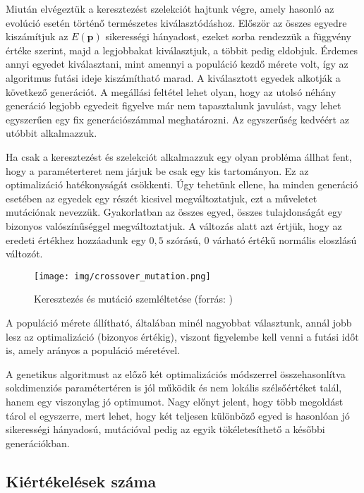 \documentclass[12pt]{article}
\begin{document}
Miután elvégeztük a keresztezést szelekciót hajtunk végre, amely hasonló az evolúció esetén történő természetes kiválasztódáshoz. Először az összes egyedre kiszámítjuk az $E(\mathbf{p})$ sikerességi hányadost, ezeket sorba rendezzük a függvény értéke szerint, majd a legjobbakat kiválasztjuk, a többit pedig eldobjuk. Érdemes annyi egyedet kiválasztani, mint amennyi a populáció kezdő mérete volt, így az algoritmus futási ideje kiszámítható marad. A kiválasztott egyedek alkotják a következő generációt. A megállási feltétel lehet olyan, hogy az utolsó néhány generáció legjobb egyedeit figyelve már nem tapasztalunk javulást, vagy lehet egyszerűen egy fix generációszámmal meghatározni. Az egyszerűség kedvéért az utóbbit alkalmazzuk.

Ha csak a keresztezést és szelekciót alkalmazzuk egy olyan probléma állhat fent, hogy a paraméterteret nem járjuk be csak egy kis tartományon. Ez az optimalizáció hatékonyságát csökkenti. Úgy tehetünk ellene, ha minden generáció esetében az egyedek egy részét kicsivel megváltoztatjuk, ezt a műveletet mutációnak nevezzük. Gyakorlatban az összes egyed, összes tulajdonságát egy bizonyos valószínűséggel megváltoztatjuk. A változás alatt azt értjük, hogy az eredeti értékhez hozzáadunk egy $0,5$ szórású, $0$ várható értékű normális eloszlású változót. %

\begin{figure}[H]
	\centering
	\texttt{[image: img/crossover\_mutation.png]}
	\caption{Keresztezés és mutáció szemléltetése (forrás: \cite{genetic_cross-mutation})}
	\label{}
\end{figure}

A populáció mérete állítható, általában minél nagyobbat választunk, annál jobb lesz az optimalizáció (bizonyos értékig), viszont figyelembe kell venni a futási időt is, amely arányos a populáció méretével.

A genetikus algoritmust az előző két optimalizációs módszerrel összehasonlítva sokdimenziós paramétertéren is jól működik és nem lokális szélsőértéket talál, hanem egy viszonylag jó optimumot. Nagy előnyt jelent, hogy több megoldást tárol el egyszerre, mert lehet, hogy két teljesen különböző egyed is hasonlóan jó sikerességi hányadosú, mutációval pedig az egyik tökéletesíthető a későbbi generációkban.
\subsection{Kiértékelések száma}
\end{document}
